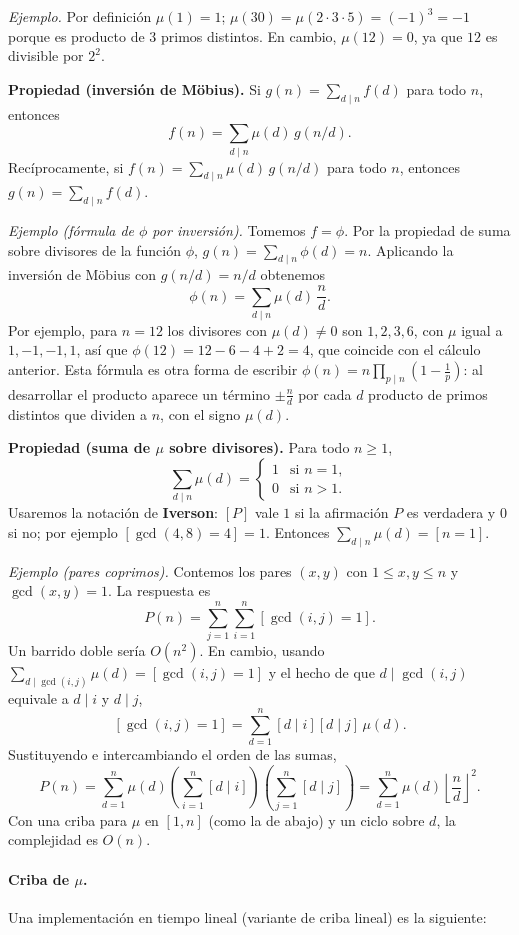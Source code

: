 \textit{Ejemplo.} Por definición \(\mu(1)=1\); \(\mu(30)=\mu(2\cdot 3\cdot 5)=(-1)^3=-1\) porque es producto de \(3\) primos distintos. En cambio, \(\mu(12)=0\), ya que \(12\) es divisible por \(2^2\).

\textbf{Propiedad (inversión de Möbius).} Si $g(n)=\sum_{d\mid n} f(d)$ para todo $n$, entonces~\cite{cf_mobius}
\[
f(n) = \sum_{d\mid n} \mu(d)\,g(n/d).
\]
Recíprocamente, si $f(n)=\sum_{d\mid n}\mu(d)\,g(n/d)$ para todo $n$, entonces $g(n)=\sum_{d\mid n} f(d)$.

\textit{Ejemplo (fórmula de $\phi$ por inversión).} Tomemos $f=\phi$. Por la propiedad de suma sobre divisores de la función $\phi$, $g(n)=\sum_{d\mid n}\phi(d)=n$. Aplicando la inversión de Möbius con $g(n/d)=n/d$ obtenemos
\[
\phi(n)=\sum_{d\mid n}\mu(d)\,\frac{n}{d}.
\]
Por ejemplo, para $n=12$ los divisores con $\mu(d)\neq 0$ son $1,2,3,6$, con $\mu$ igual a $1,-1,-1,1$, así que $\phi(12)=12-6-4+2=4$, que coincide con el cálculo anterior. Esta fórmula es otra forma de escribir $\phi(n)=n\prod_{p\mid n}\left(1-\frac1p\right)$: al desarrollar el producto aparece un término $\pm\frac{n}{d}$ por cada $d$ producto de primos distintos que dividen a $n$, con el signo $\mu(d)$.

\textbf{Propiedad (suma de $\mu$ sobre divisores).} Para todo $n\ge 1$,
\[
\sum_{d \mid n} \mu(d) =
\begin{cases}
1 & \text{si } n = 1, \\
0 & \text{si } n > 1.
\end{cases}
\]
Usaremos la notación de \textbf{Iverson}: $[P]$ vale $1$ si la afirmación $P$ es verdadera y $0$ si no; por ejemplo $[\gcd(4,8)=4]=1$. Entonces $\sum_{d \mid n} \mu(d) = [n=1]$.

\textit{Ejemplo (pares coprimos).} Contemos los pares $(x,y)$ con $1\le x,y\le n$ y $\gcd(x,y)=1$. La respuesta es
\[
P(n)=\sum_{j=1}^{n} \sum_{i=1}^{n} [\gcd(i,j)=1].
\]
Un barrido doble sería $O(n^2)$. En cambio, usando $\sum_{d\mid \gcd(i,j)}\mu(d)=[\gcd(i,j)=1]$ y el hecho de que $d\mid \gcd(i,j)$ equivale a $d\mid i$ y $d\mid j$,
\[
[\gcd(i,j)=1] = \sum_{d=1}^{n} [d\mid i][d\mid j]\,\mu(d).
\]
Sustituyendo e intercambiando el orden de las sumas,
\[
P(n)=\sum_{d=1}^{n} \mu(d)\left(\sum_{i=1}^{n} [d\mid i]\right)\left(\sum_{j=1}^{n} [d\mid j]\right)
= \sum_{d=1}^{n} \mu(d)\left\lfloor \frac{n}{d} \right\rfloor^2.
\]
Con una criba para $\mu$ en $[1,n]$ (como la de abajo) y un ciclo sobre $d$, la complejidad es $O(n)$.

\paragraph{Criba de $\mu$.} Una implementación en tiempo lineal (variante de criba lineal) es la siguiente:

